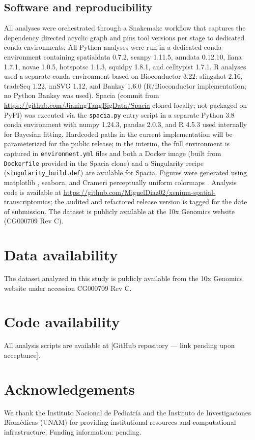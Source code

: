 \documentclass[12pt,a4paper]{article}
\begin{document}
\subsection*{Software and reproducibility}
All analyses were orchestrated through a Snakemake workflow \citep{molder2021snakemake} that captures the dependency directed acyclic graph and pins tool versions per stage to dedicated conda environments. All Python analyses were run in a dedicated conda environment containing spatialdata 0.7.2, scanpy 1.11.5, anndata 0.12.10, liana 1.7.1, novae 1.0.5, hotspotsc 1.1.3, squidpy 1.8.1, and celltypist 1.7.1. R analyses used a separate conda environment based on Bioconductor 3.22: slingshot 2.16, tradeSeq 1.22, nnSVG 1.12, and Banksy 1.6.0 (R/Bioconductor implementation; no Python Banksy was used). Spacia (commit from \url{https://github.com/JianingTangBigData/Spacia} cloned locally; not packaged on PyPI) was executed via the \texttt{spacia.py} entry script in a separate Python 3.8 conda environment with numpy 1.24.3, pandas 2.0.3, and R 4.5.3 used internally for Bayesian fitting. Hardcoded paths in the current implementation will be parameterized for the public release; in the interim, the full environment is captured in \texttt{environment.yml} files and both a Docker image (built from \texttt{Dockerfile} provided in the Spacia clone) and a Singularity recipe (\texttt{singularity\_build.def}) are available for Spacia. Figures were generated using matplotlib \citep{hunter2007matplotlib}, seaborn, and Crameri perceptually uniform colormaps \citep{crameri2023scientific}. Analysis code is available at \url{https://github.com/MiguelDiaz02/xenium-spatial-transcriptomics}; the audited and refactored release version is tagged for the date of submission. The dataset is publicly available at the 10x Genomics website (CG000709 Rev C).

\section*{Data availability}
The dataset analyzed in this study is publicly available from the 10x Genomics website under accession CG000709 Rev C.

\section*{Code availability}
All analysis scripts are available at [GitHub repository --- link pending upon acceptance].

\section*{Acknowledgements}
We thank the Instituto Nacional de Pediatr\'{i}a and the Instituto de Investigaciones Biom\'{e}dicas (UNAM) for providing institutional resources and computational infrastructure. Funding information: pending.
\end{document}
